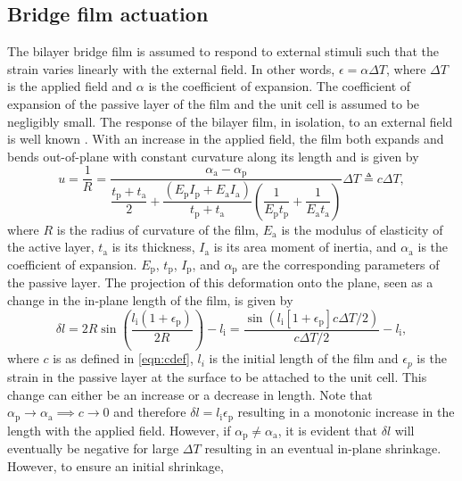\documentclass[final,times,5p]{elsarticle}
\numberwithin{equation}{section}
\begin{document}
\subsection{Bridge film actuation} \label{sec:BFA}
The bilayer bridge film is assumed to respond to external stimuli such that the strain varies linearly with the external field. In other words, $\epsilon=\alpha\Delta T$, where $\Delta T$ is the applied field and $\alpha$ is the coefficient of expansion. The coefficient of expansion of the passive layer of the film and the unit cell is assumed to be negligibly small. The response of the bilayer film, in isolation, to an external field is well known \citep{timoshenko1925analysis}. With an increase in the applied field, the film both expands and bends out-of-plane with constant curvature along its length and is given by \citep{timoshenko1925analysis}
\begin{equation} \label{eqn:cdef}
    u=\frac{1}{R}=\frac{\alpha_\mathrm{a}-\alpha_\mathrm{p}}{\dfrac{t_\mathrm{p}+t_\mathrm{a}}{2}+\dfrac{(E_\mathrm{p} I_\mathrm{p} + E_\mathrm{a} I_\mathrm{a})}{t_\mathrm{p}+t_\mathrm{a}}\left(\dfrac{1}{E_\mathrm{p} t_\mathrm{p}}+\dfrac{1}{E_\mathrm{a} t_\mathrm{a}}\right)}\Delta T\triangleq c \Delta T,
\end{equation}
where $R$ is the radius of curvature of the film, $E_\mathrm{a}$ is the modulus of elasticity of the active layer, $t_\mathrm{a}$ is its thickness, $I_\mathrm{a}$ is its area moment of inertia, and $\alpha_\mathrm{a}$ is the coefficient of expansion. $E_\mathrm{p}$, $t_\mathrm{p}$, $I_\mathrm{p}$, and $\alpha_\mathrm{p}$ are the corresponding parameters of the passive layer. The projection of this deformation onto the plane, seen as a change in the in-plane length of the film, is given by
\begin{equation}
    \delta l=2 R \sin{\left(\frac{l_\mathrm{i}(1+\epsilon_\mathrm{p})}{2 R}\right)}-l_\mathrm{i}=\frac{\sin(l_\mathrm{i}[1+\epsilon_\mathrm{p}] c\Delta T/2)}{c \Delta T/2}-l_\mathrm{i},
\end{equation}
where $c$ is as defined in \cref{eqn:cdef}, $l_i$ is the initial length of the film and $\epsilon_p$ is the strain in the passive layer at the surface to be attached to the unit cell. This change can either be an increase or a decrease in length. Note that $\alpha_\mathrm{p} \to \alpha_\mathrm{a} \implies c \to 0$ and therefore $\delta l = l_\mathrm{i}\epsilon_\mathrm{p}$ resulting in a monotonic increase in the length with the applied field. However, if $\alpha_\mathrm{p} \neq \alpha_\mathrm{a}$, it is evident that $\delta l$ will eventually be negative for large $\Delta T$ resulting in an eventual in-plane shrinkage. However, to ensure an initial shrinkage,
\end{document}
